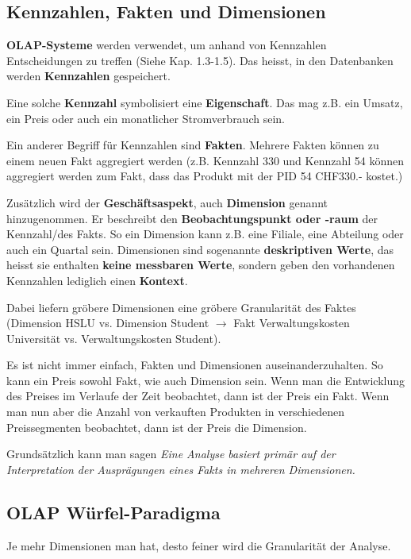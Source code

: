 \documentclass[a4paper, 11pt, nofootinbib]{article}
\begin{document}
\subsection{Kennzahlen, Fakten und Dimensionen}

\noindent \textbf{OLAP-Systeme} werden verwendet, um anhand von Kennzahlen Entscheidungen zu treffen (Siehe Kap. 1.3-1.5). Das heisst, in den Datenbanken werden \textbf{Kennzahlen} gespeichert. 

\vspace{10px}

\noindent Eine solche \textbf{Kennzahl} symbolisiert eine \textbf{Eigenschaft}. Das mag z.B. ein Umsatz, ein Preis oder auch ein monatlicher Stromverbrauch sein.

Ein anderer Begriff für Kennzahlen sind \textbf{Fakten}. Mehrere Fakten können zu einem neuen Fakt aggregiert werden (z.B. Kennzahl 330 und Kennzahl 54 können aggregiert werden zum Fakt, dass das Produkt mit der PID 54 CHF330.- kostet.)

Zusätzlich wird der \textbf{Geschäftsaspekt}, auch \textbf{Dimension} genannt hinzugenommen. Er beschreibt den \textbf{Beobachtungspunkt oder -raum} der Kennzahl/des Fakts. So ein Dimension kann z.B. eine Filiale, eine Abteilung oder auch ein Quartal sein. Dimensionen sind sogenannte \textbf{deskriptiven Werte}, das heisst sie enthalten \textbf{keine messbaren Werte}, sondern geben den vorhandenen Kennzahlen lediglich einen \textbf{Kontext}.

Dabei liefern gröbere Dimensionen eine gröbere Granularität des Faktes (Dimension HSLU vs. Dimension Student $\rightarrow$ Fakt Verwaltungskosten Universität vs. Verwaltungskosten Student).

Es ist nicht immer einfach, Fakten und Dimensionen auseinanderzuhalten. So kann ein Preis sowohl Fakt, wie auch Dimension sein. Wenn man die Entwicklung des Preises im Verlaufe der Zeit beobachtet, dann ist der Preis ein Fakt. Wenn man nun aber die Anzahl von verkauften Produkten in verschiedenen Preissegmenten beobachtet, dann ist der Preis die Dimension.

\vspace{10px}

\noindent Grundsätzlich kann man sagen \textit{Eine Analyse basiert primär auf der Interpretation der Ausprägungen eines Fakts in mehreren Dimensionen.}

\newpage

\subsection{OLAP Würfel-Paradigma}
Je mehr Dimensionen man hat, desto feiner wird die Granularität der Analyse. 
\end{document}
